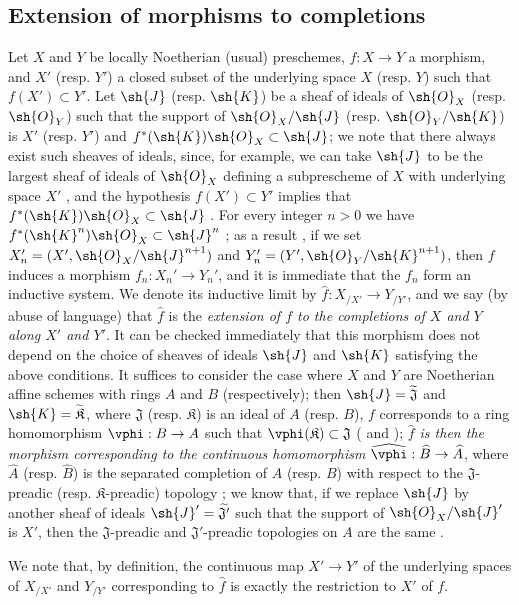 \subsection{Extension of morphisms to completions}
\label{subsection:I.10.9}

\begin{env}[10.9.1]
\label{I.10.9.1}
Let $X$ and $Y$ be locally Noetherian (usual) preschemes, $f:X\to Y$ a morphism, and $X'$ (resp. $Y'$) a closed subset of the underlying space $X$ (resp. $Y$) such that $f(X')\subset Y'$.
Let $\sh{J}$ (resp. $\sh{K}$) be a sheaf of ideals of $\sh{O}_X$ (resp. $\sh{O}_Y$) such that the support of $\sh{O}_X/\sh{J}$ (resp. $\sh{O}_Y/\sh{K}$) is $X'$ (resp. $Y'$) and $f^*(\sh{K})\sh{O}_X\subset\sh{J}$; we note that there always exist such sheaves of ideals, since, for example, we can take $\sh{J}$ to be the largest sheaf of ideals of $\sh{O}_X$ defining a subprescheme of $X$ with underlying space $X'$ , and the hypothesis $f(X')\subset Y'$ implies that $f^*(\sh{K})\sh{O}_X\subset\sh{J}$ .
For every integer $n>0$ we have $f^*(\sh{K}^n)\sh{O}_X\subset\sh{J}^n$ ; as a result , if we set $X_n'=(X',\sh{O}_X/\sh{J}^{n+1})$ and $Y_n'=(Y',\sh{O}_Y/\sh{K}^{n+1})$, then $f$ induces a morphism $f_n:X_n'\to Y_n'$, and it is immediate that the $f_n$ form an inductive system.
We denote its inductive limit  by $\widehat{f}:X_{/X'}\to Y_{/Y'}$, and we say (by abuse of language) that $\widehat{f}$ is the \emph{extension of $f$ to the completions of $X$ and $Y$ along $X'$ and $Y'$}.
It can be checked immediately that this morphism does not depend on the choice of sheaves of ideals $\sh{J}$ and $\sh{K}$ satisfying the above conditions.
It suffices to consider the case where $X$ and $Y$ are Noetherian affine schemes with rings $A$ and $B$ (respectively); then $\sh{J}=\widetilde{\mathfrak{J}}$ and $\sh{K}=\widetilde{\mathfrak{K}}$, where $\mathfrak{J}$ (resp. $\mathfrak{K}$) is an ideal of $A$ (resp. $B$), $f$ corresponds to a ring homomorphism $\vphi:B\to A$ such that $\vphi(\mathfrak{K})\subset\mathfrak{J}$ ( and ); \emph{$\widehat{f}$ is then the morphism corresponding  to the continuous homomorphism $\widehat{\vphi}:\widehat{B}\to\widehat{A}$}, where $\widehat{A}$ (resp. $\widehat{B}$) is the separated completion of $A$ (resp. $B$) with respect to the $\mathfrak{J}$-preadic (resp. $\mathfrak{K}$-preadic) topology ; we know that, if we replace $\sh{J}$ by another
sheaf of ideals $\sh{J}'=\widetilde{\mathfrak{J}'}$ such that the support of $\sh{O}_X/\sh{J}'$ is $X'$, then the $\mathfrak{J}$-preadic and $\mathfrak{J}'$-preadic topologies on $A$ are the same .

We note that, by definition, the continuous map $X'\to Y'$ of the underlying spaces of $X_{/X'}$ and $Y_{/Y'}$ corresponding to $\widehat{f}$ is exactly the restriction to $X'$ of $f$.
\end{env}

